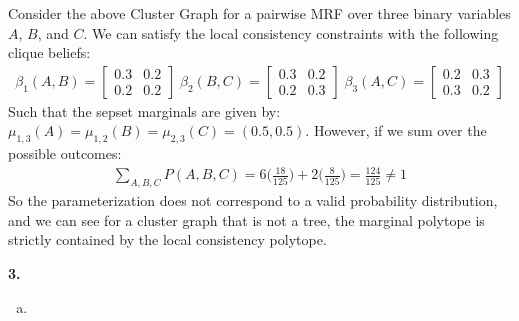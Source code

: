 \documentclass{article}
\begin{document}
\begin{enumerate}[(a)]
    Consider the above Cluster Graph for a pairwise MRF over three binary variables $A$, $B$, and $C$. We can satisfy the local consistency constraints with the following clique beliefs: 
\begin{gather*}
            \beta_{1}(A, B) =
            \begin{bmatrix}
                0.3 & 0.2\\ 0.2 & 0.2
            \end{bmatrix} \;
\beta_{2}(B, C) =
            \begin{bmatrix}
                0.3 & 0.2\\ 0.2 & 0.3
            \end{bmatrix}\;
\beta_{3}(A, C) =
            \begin{bmatrix}
                0.2 & 0.3 \\ 0.3 & 0.2
            \end{bmatrix}
    \end{gather*}
    Such that the sepset marginals are given by: $\mu_{1,3}(A) = \mu_{1,2}(B) = \mu_{2,3}(C) = (0.5, 0.5)$. However, if we sum over the possible outcomes: \begin{align*}
        \sum_{A, B, C} P(A, B, C) = 6 \bigg(\frac{18}{125}\bigg) + 2 \bigg(\frac{8}{125}\bigg) = \frac{124}{125} \neq 1
    \end{align*}
    So the parameterization does not correspond to a valid probability distribution, and we can see for a cluster graph that is not a tree, the marginal polytope is strictly contained by the local consistency polytope. 
\end{enumerate}


\textbf{3.} \begin{enumerate}[(a)]
    \item 
\end{enumerate}
\end{document}
